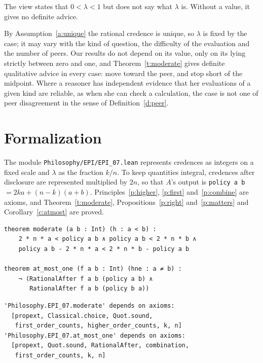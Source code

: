 \documentclass{situationist-preprint}
\begin{document}
\begin{objection}
The view states that $0 < \lambda < 1$ but does not say what $\lambda$ is. Without a value, it gives no definite advice.
\end{objection}

\begin{reply}
By Assumption~\ref{a:unique} the rational credence is unique, so $\lambda$ is fixed by the case; it may vary with the kind of question, the difficulty of the evaluation and the number of peers. Our results do not depend on its value, only on its lying strictly between zero and one, and Theorem~\ref{t:moderate} gives definite qualitative advice in every case: move toward the peer, and stop short of the midpoint. Where a reasoner has independent evidence that her evaluations of a given kind are reliable, as when she can check a calculation, the case is not one of peer disagreement in the sense of Definition~\ref{d:peer}.
\end{reply}

\section{Formalization}

The module \nolinkurl{Philosophy/EPI/EPI_07.lean} represents credences as integers on a fixed scale and $\lambda$ as the fraction $k/n$. To keep quantities integral, credences after disclosure are represented multiplied by $2n$, so that $A$'s output is \texttt{policy a b} $= 2ka + (n-k)(a+b)$. Principles~\ref{p:higher}, \ref{p:first} and~\ref{p:combine} are axioms, and Theorem~\ref{t:moderate}, Propositions~\ref{p:right} and~\ref{p:matters} and Corollary~\ref{c:atmost} are proved.

\begin{lstlisting}
theorem moderate (a b : Int) (h : a < b) :
    2 * n * a < policy a b ∧ policy a b < 2 * n * b ∧
    policy a b - 2 * n * a < 2 * n * b - policy a b

theorem at_most_one (f a b : Int) (hne : a ≠ b) :
    ¬ (RationalAfter f a b (policy a b) ∧
       RationalAfter f a b (policy b a))
\end{lstlisting}

\begin{lstlisting}
'Philosophy.EPI_07.moderate' depends on axioms:
  [propext, Classical.choice, Quot.sound,
   first_order_counts, higher_order_counts, k, n]
'Philosophy.EPI_07.at_most_one' depends on axioms:
  [propext, Quot.sound, RationalAfter, combination,
   first_order_counts, k, n]
\end{lstlisting}
\end{document}
